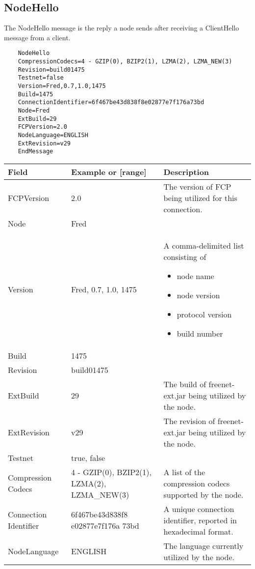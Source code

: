 \subsection{NodeHello}
The NodeHello message is the reply a node sends after receiving a ClientHello message from a client.
\begin{verbatim}
    NodeHello
    CompressionCodecs=4 - GZIP(0), BZIP2(1), LZMA(2), LZMA_NEW(3)
    Revision=build01475
    Testnet=false
    Version=Fred,0.7,1.0,1475
    Build=1475
    ConnectionIdentifier=6f467be43d838f8e02877e7f176a73bd
    Node=Fred
    ExtBuild=29
    FCPVersion=2.0
    NodeLanguage=ENGLISH
    ExtRevision=v29
    EndMessage
\end{verbatim}
\begin{tabularx}{\textwidth}{p{3cm}|p{3cm}|p{7.5cm}}
\toprule
    Field & Example or [range] & Description \\
\midrule 
FCPVersion & 2.0 &  The version of FCP being utilized for this connection. \\
\addlinespace
\hline
\addlinespace
Node & Fred & \\
\addlinespace
\hline
\addlinespace
Version & Fred, 0.7, 1.0, 1475 & A comma-delimited list consisting of 
\begin{itemize}
    \item node name
    \item node version
    \item protocol version
    \item build number
\end{itemize}\\
\addlinespace
\hline
\addlinespace
Build & 1475 & \\
\addlinespace
\hline
\addlinespace
Revision & build01475 & \\
\addlinespace
\hline
\addlinespace
ExtBuild & 29 & The build of freenet-ext.jar being utilized by the node.\\
\addlinespace
\hline
\addlinespace
ExtRevision & v29 & The revision of freenet-ext.jar being utilized by the node.\\
\addlinespace
\hline
\addlinespace
Testnet & true, false & \\
\addlinespace
\hline
\addlinespace
Compression Codecs & 4 - GZIP(0), BZIP2(1), LZMA(2), LZMA_NEW(3) & A list of the compression codecs supported by the node.\\
\addlinespace
\hline
\addlinespace
Connection Identifier & 6f467be43d838f8 e02877e7f176a 73bd & A unique connection identifier, reported in hexadecimal format.\\
\addlinespace
\hline
\addlinespace
NodeLanguage & ENGLISH & The language currently utilized by the node.\\
\bottomrule
\end{tabularx}
